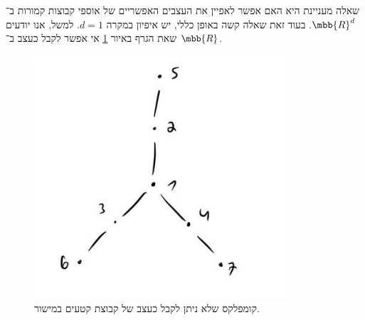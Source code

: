 \documentclass[a4paper,10pt,twoside,openany]{book}
\begin{document}
\begin{remark}
שאלה מעניינת היא האם אפשר לאפיין את העצבים האפשריים של אוספי קבוצות קמורות ב־%
$\mbb{R}^d$.
בעוד זאת שאלה קשה באופן כללי, יש איפיון במקרה
$d = 1$.
למשל, אנו יודעים שאת הגרף באיור
\ref{figure:1}
אי אפשר לקבל כעצב ב־%
$\mbb{R}$.
\begin{figure}
\centering
\includegraphics[scale=0.4]{sources/1}
\caption{קומפלקס שלא ניתן לקבל כעצב של קבוצת קטעים במישור.}
\label{figure:1}
\end{figure}


\end{remark}
\end{document}
